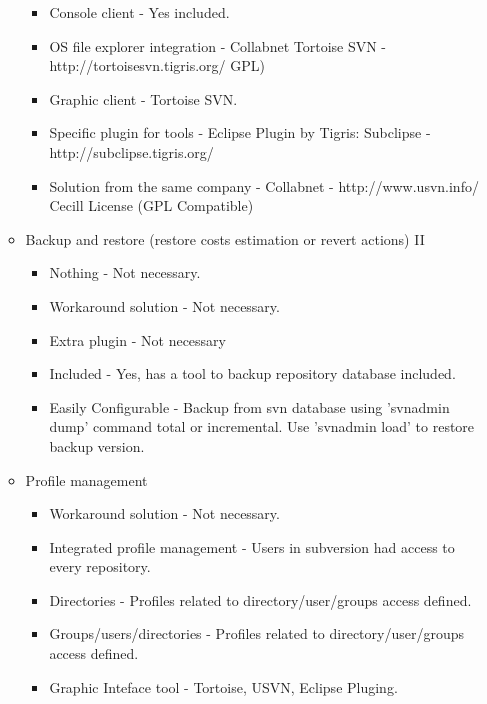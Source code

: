 \documentclass[11pt]{scrartcl}
\begin{document}
\begin{enumerate}
\begin{itemize}
            \begin{itemize}
                \item Console client - Yes included.
                \item OS file explorer integration - Collabnet Tortoise SVN - http://tortoisesvn.tigris.org/ GPL)
                \item Graphic client - Tortoise SVN.
                \item Specific plugin for tools - Eclipse Plugin by Tigris: Subclipse - http://subclipse.tigris.org/
                \item Solution from the same company - Collabnet - http://www.usvn.info/ Cecill License (GPL Compatible)
            \end{itemize}
	    \item Backup and restore (restore costs estimation or revert actions) II
            \begin{itemize}
                \item Nothing - Not necessary.
                \item Workaround solution - Not necessary.
                \item Extra plugin - Not necessary
                \item Included - Yes, has a tool to backup repository database included.
                \item Easily Configurable - Backup from svn database using 'svnadmin dump' command total or incremental. Use 'svnadmin load' to restore backup version.
            \end{itemize}

	    \item Profile management 
            \begin{itemize}
                \item Workaround solution - Not necessary.
                \item Integrated profile management - Users in subversion had access to every repository.
                \item Directories - Profiles related to directory/user/groups access defined.
                \item Groups/users/directories - Profiles related to directory/user/groups access defined.
                \item Graphic Inteface tool - Tortoise, USVN, Eclipse Pluging.
            \end{itemize}
        \end{itemize}


\end{enumerate}
\end{document}

